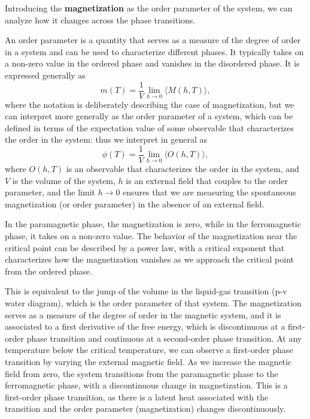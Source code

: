 Introducing the \textbf{magnetization} as the order parameter of the system, we can analyze how it changes across the phase transitions.

\begin{definition}
    An order parameter is a quantity that serves as a measure of the degree of order in a system and can be used to characterize different phases. It typically takes on a non-zero value in the ordered phase and vanishes in the disordered phase. It is expressed generally as
    \[
        m(T) = \frac{1}{V} \lim_{h \to 0} \langle M(h,T) \rangle,
    \]
    where the notation is deliberately describing the case of magnetization, but we can interpret more generally as the order parameter of a system, which can be defined in terms of the expectation value of some observable that characterizes the order in the system: thus we interpret in general as
    \[
        \phi(T) = \frac{1}{V} \lim_{h \to 0} \langle O(h,T) \rangle,
    \]
    where $O(h,T)$ is an observable that characterizes the order in the system, and $V$ is the volume of the system, \(h\) is an external field that couples to the order parameter, and the limit \(h \to 0\) ensures that we are measuring the spontaneous magnetization (or order parameter) in the absence of an external field.
\end{definition}

In the paramagnetic phase, the magnetization is zero, while in the ferromagnetic phase, it takes on a non-zero value. The behavior of the magnetization near the critical point can be described by a power law, with a critical exponent that characterizes how the magnetization vanishes as we approach the critical point from the ordered phase. 

This is equivalent to the jump of the volume in the liquid-gas transition (p-v water diagram), which is the order parameter of that system. The magnetization serves as a measure of the degree of order in the magnetic system, and it is associated to a first derivative of the free energy, which is discontinuous at a first-order phase transition and continuous at a second-order phase transition.
At any temperature below the critical temperature, we can observe a first-order phase transition by varying the external magnetic field. As we increase the magnetic field from zero, the system transitions from the paramagnetic phase to the ferromagnetic phase, with a discontinuous change in magnetization. This is a first-order phase transition, as there is a latent heat associated with the transition and the order parameter (magnetization) changes discontinuously.

